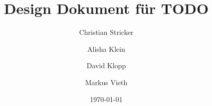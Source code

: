 \usepackage[all]{nowidow}
\usepackage[T1]{fontenc}
\usepackage[utf8]{inputenc}
\usepackage{graphicx}
\usepackage{xcolor}
\usepackage[section]{placeins}
\usepackage{hyperref}
\usepackage{ngerman, graphicx, wrapfig, listings, float}

\usepackage[font={color=ChapterBlue},figurename=fig.,labelfont={bf}]{caption}

\usepackage{epstopdf}
\pagestyle{plain}
\title{Design Dokument für TODO}
\author{Christian Stricker \and Alisha Klein \and David Klopp \and Markus Vieth}
\date{\today}

